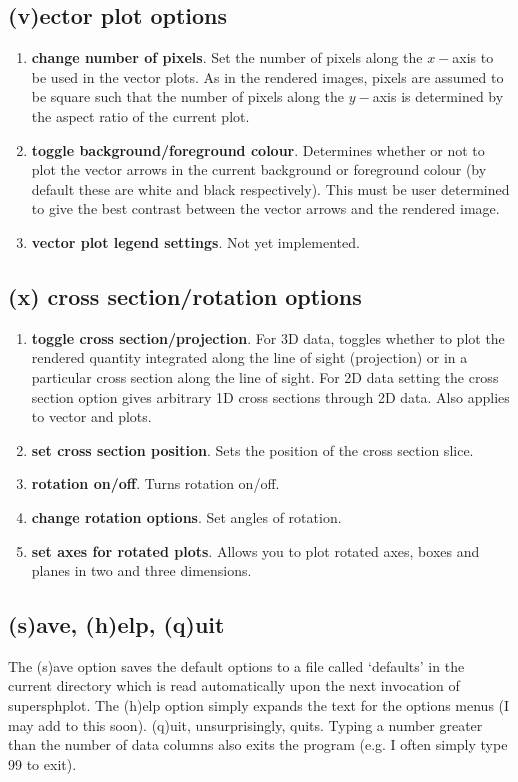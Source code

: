 \documentclass[a4paper,12pt]{article}
\begin{document}
\subsection{(v)ector plot options}
\begin{enumerate}
\item \textbf{change number of pixels}. Set the number of pixels along the
$x-$axis to be used in the vector plots. As in the rendered images, pixels are assumed to be square such that the number of pixels along
the $y-$axis is determined by the aspect ratio of the current plot.
\item \textbf{toggle background/foreground colour}. Determines whether or not to
plot the vector arrows in the current background or foreground colour (by
default these are white and black respectively). This must
be user determined to give the best contrast between the vector arrows and the
rendered image.
\item \textbf{vector plot legend settings}. Not yet implemented.
\end{enumerate}

\subsection{(x) cross section/rotation options}
\begin{enumerate}
\item \textbf{toggle cross section/projection}. For 3D data, toggles whether to
plot the rendered quantity integrated along the line of sight (projection) or in
a particular cross section along the line of sight. For 2D data setting the
cross section option gives arbitrary 1D cross sections through 2D data. Also applies to vector and plots.
\item \textbf{set cross section position}. Sets the position of the cross section slice.
\item \textbf{rotation on/off}. Turns rotation on/off.
\item \textbf{change rotation options}. Set angles of rotation.
\item \textbf{set axes for rotated plots}. Allows you to plot rotated axes, boxes and planes
in two and three dimensions.
\end{enumerate}

\subsection{(s)ave, (h)elp, (q)uit}
 The (s)ave option saves the default options to a file called `defaults' in the
current directory which is read automatically upon the next invocation of
supersphplot. The (h)elp option simply expands the text for the options menus (I
may add to this soon). (q)uit, unsurprisingly, quits. Typing a number greater than the number of
data columns also exits the program (e.g. I often simply type 99 to exit).
\end{document}
